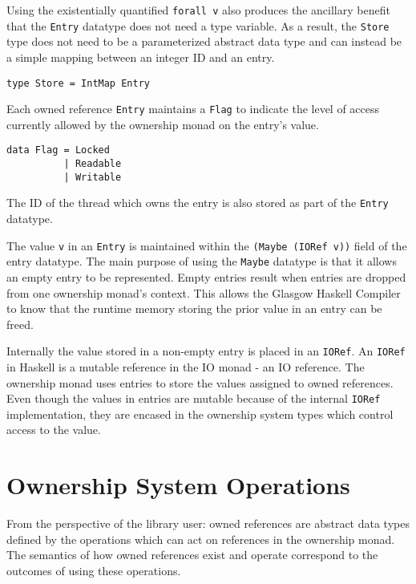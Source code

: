 \documentclass[onehalf,11pt]{beavtex}
\begin{document}
Using the existentially quantified \texttt{forall v} also produces the
ancillary benefit that the \texttt{Entry} datatype does not need a type
variable.
As a result, the \texttt{Store} type does not need to be a parameterized abstract
data type and can instead be a simple mapping between an integer ID and an entry.

\begin{verbatim}
type Store = IntMap Entry
\end{verbatim}

Each owned reference \texttt{Entry} maintains a \texttt{Flag} to indicate the
level of access currently allowed by the ownership monad on the entry's value.

\begin{verbatim}
data Flag = Locked
          | Readable
          | Writable
\end{verbatim}

The ID of the thread which owns the entry is also stored as part of the
\texttt{Entry} datatype. 

The value \texttt{v} in an \texttt{Entry} is maintained within the
\texttt{(Maybe (IORef v))} field of the entry datatype.
The main purpose of using the \texttt{Maybe} datatype is that it allows an empty
entry to be represented.
Empty entries result when entries are dropped from one ownership monad's
context.  This allows the Glasgow Haskell Compiler to know that
the runtime memory storing the prior value in an entry can be freed.

Internally the value stored in a non-empty entry is placed in an \texttt{IORef}.
An \texttt{IORef} in Haskell is a mutable reference in the IO monad - an IO
reference. %
The ownership monad uses entries to store the values assigned to owned
references.
Even though the values in entries are mutable because of the internal
\texttt{IORef} implementation, they are encased in the ownership system types
which control access to the value.

\section{Ownership System Operations}

From the perspective of the library user: owned references are abstract
data types defined by the operations which can act on references in the
ownership monad.
The semantics of how owned references exist and operate correspond to the
outcomes of using these operations.
\end{document}
